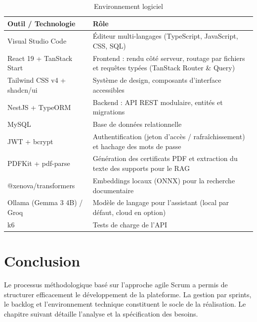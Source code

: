 \documentclass[12pt,a4paper]{report}
\begin{document}
\begin{table}[H]
\centering
\begin{tabular}{|p{4.4cm}|p{8.6cm}|}
\hline
\textbf{Outil / Technologie} & \textbf{Rôle} \\
\hline
Visual Studio Code & Éditeur multi-langages (TypeScript, JavaScript, CSS, SQL) \\
\hline
React 19 + TanStack Start & Frontend : rendu côté serveur, routage par fichiers et requêtes typées (TanStack Router \& Query) \\
\hline
Tailwind CSS v4 + shadcn/ui & Système de design, composants d'interface accessibles \\
\hline
NestJS + TypeORM & Backend : API REST modulaire, entités et migrations \\
\hline
MySQL & Base de données relationnelle \\
\hline
JWT + bcrypt & Authentification (jeton d'accès / rafraîchissement) et hachage des mots de passe \\
\hline
PDFKit + pdf-parse & Génération des certificats PDF et extraction du texte des supports pour le RAG \\
\hline
@xenova/transformers & Embeddings locaux (ONNX) pour la recherche documentaire \\
\hline
Ollama (Gemma 3 4B) / Groq & Modèle de langage pour l'assistant (local par défaut, cloud en option) \\
\hline
k6 & Tests de charge de l'API \\
\hline
\end{tabular}
\caption{Environnement logiciel}
\end{table}

\section*{Conclusion}
\hrulefill

Le processus méthodologique basé sur l'approche agile Scrum a permis de structurer efficacement le développement de la plateforme. La gestion par sprints, le backlog et l'environnement technique constituent le socle de la réalisation. Le chapitre suivant détaille l'analyse et la spécification des besoins.

\end{document}
